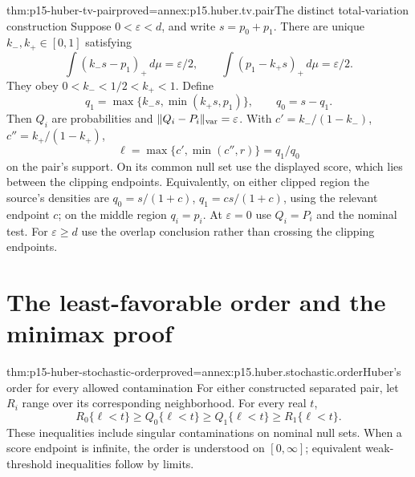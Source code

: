 \begin{hbtheorem}{thm:p15-huber-tv-pair}{proved=annex:p15.huber.tv.pair}{The distinct total-variation construction}
Suppose \(0<\varepsilon<d\), and write \(s=p_0+p_1\).
There are unique \(k_-,k_+\in[0,1]\) satisfying
\[
 \int(k_-s-p_1)_+\,d\mu=\varepsilon/2,\qquad
 \int(p_1-k_+s)_+\,d\mu=\varepsilon/2.
\]
They obey \(0<k_-<1/2<k_+<1\). Define
\[
 q_1=\max\{k_-s,\min(k_+s,p_1)\},\qquad q_0=s-q_1.
\]
Then \(Q_i\) are probabilities and
\(\|Q_i-P_i\|_{\rm var}=\varepsilon\).
With \(c'=k_-/(1-k_-)\), \(c''=k_+/(1-k_+)\),
\[
 \ell=\max\{c',\min(c'',r)\}=q_1/q_0
\]
on the pair's support. On its common null set use the displayed score,
which lies between the clipping endpoints.
Equivalently, on either clipped region the source's densities are
\(q_0=s/(1+c)\), \(q_1=cs/(1+c)\), using the relevant endpoint \(c\);
on the middle region \(q_i=p_i\).
At \(\varepsilon=0\) use \(Q_i=P_i\) and the nominal test.
For \(\varepsilon\geq d\) use the overlap conclusion rather than
crossing the clipping endpoints.
\end{hbtheorem}

\section{The least-favorable order and the minimax proof}
\label{sec:p15-robust-minimax}

\begin{hblemma}{thm:p15-huber-stochastic-order}{proved=annex:p15.huber.stochastic.order}{Huber's order for every allowed contamination}
For either constructed separated pair, let \(R_i\) range over its
corresponding neighborhood. For every real \(t\),
\[
 R_0\{\ell<t\}\geq Q_0\{\ell<t\}
       \geq Q_1\{\ell<t\}\geq R_1\{\ell<t\}.
\]
These inequalities include singular contaminations on nominal null sets.
When a score endpoint is infinite, the order is understood on
\([0,\infty]\); equivalent weak-threshold inequalities follow by limits.
\end{hblemma}

